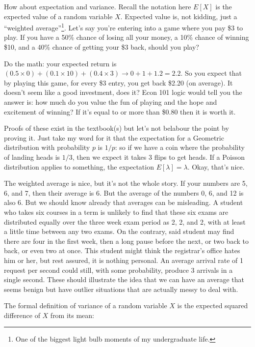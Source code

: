 \documentclass[a4paper]{report}
\begin{document}
How about expectation and variance. Recall the notation here $E[X]$ is the expected value of a random variable $X$. Expected value is, not kidding, just a ``weighted average''\footnote{One of the biggest light bulb moments of my undergraduate life.}. Let's say you're entering into a game where you pay \$3 to play. If you have a 50\% chance of losing all your money, a 10\% chance of winning \$10, and a 40\% chance of getting your \$3 back, should you play?

Do the math: your expected return is $(0.5 \times 0) + (0.1 \times 10) + (0.4 \times 3) \rightarrow 0 + 1 + 1.2 = 2.2$. So you expect that by playing this game, for every \$3 entry, you get back \$2.20 (on average). It doesn't seem like a good investment, does it? Econ 101 logic would tell you the answer is: how much do you value the fun of playing and the hope and excitement of winning? If it's equal to or more than \$0.80 then it is worth it.

Proofs of these exist in the textbook(s) but let's not belabour the point by proving it. Just take my word for it that the expectation for a Geometric distribution with probability $p$ is $1/p$: so if we have a coin where the probability of landing heads is $1/3$, then we expect it takes 3 flips to get heads. If a Poisson distribution applies to something, the expectation $E[\lambda] = \lambda$. Okay, that's nice.

The weighted average is nice, but it's not the whole story. If your numbers are 5, 6, and 7, then their average is 6. But the average of the numbers 0, 6, and 12 is also 6. But we should know already that averages can be misleading. A student who takes six courses in a term is unlikely to find that these six exams are distributed equally over the three week exam period as 2, 2, and 2, with at least a little time between any two exams. On the contrary, said student may find there are four in the first week, then a long pause before the next, or two back to back, or even two at once. This student might think the registrar's office hates him or her, but rest assured, it is nothing personal. An average arrival rate of 1 request per second could still, with some probability, produce 3 arrivals in a single second. These should illustrate the idea that we can have an average that seems benign but have outlier situations that are actually messy to deal with.

The formal definition of variance of a random variable $X$ is the expected squared difference of $X$ from its mean:
\end{document}
